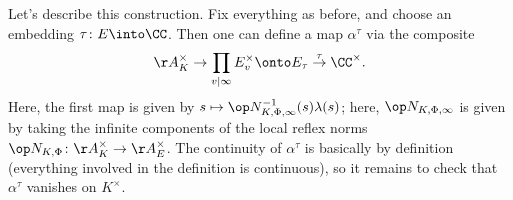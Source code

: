 \documentclass[../notes.tex]{subfiles}
\begin{document}
Let's describe this construction. Fix everything as before, and choose an embedding $\tau\colon E\into\CC$. Then one can define a map $\alpha^\tau$ via the composite
\[\AA_K^\times\to\prod_{v\mid\infty}E_v^\times\onto E_\tau\stackrel\tau\to\CC^\times.\]
Here, the first map is given by $s\mapsto\op N_{K,\Phi,\infty}^{-1}(s)\lambda(s)$; here, $\op N_{K,\Phi,\infty}$ is given by taking the infinite components of the local reflex norms $\op N_{K,\Phi}\colon\AA_K^\times\to\AA_E^\times$. The continuity of $\alpha^\tau$ is basically by definition (everything involved in the definition is continuous), so it remains to check that $\alpha^\tau$ vanishes on $K^\times$.
\end{document}
